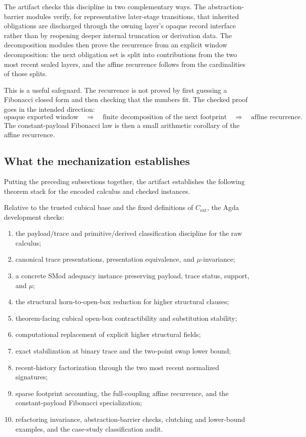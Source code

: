 The artifact checks this discipline in two complementary ways.  The abstraction-barrier modules
verify, for representative later-stage transitions, that inherited obligations are discharged
through the owning layer's opaque record interface rather than by reopening deeper internal
truncation or derivation data.  The decomposition modules then prove the recurrence from an
explicit window decomposition: the next obligation set is split into contributions from the two
most recent sealed layers, and the affine recurrence follows from the cardinalities of those
splits.

This is a useful safeguard.  The recurrence is not proved by first guessing a Fibonacci closed
form and then checking that the numbers fit.  The checked proof goes in the intended direction:
\[
  \text{opaque exported window}
  \quad\Longrightarrow\quad
  \text{finite decomposition of the next footprint}
  \quad\Longrightarrow\quad
  \text{affine recurrence}.
\]
The constant-payload Fibonacci law is then a small arithmetic corollary of the affine
recurrence.

\subsection{What the mechanization establishes}
\label{subsec:what-mechanization-establishes}

Putting the preceding subsections together, the artifact establishes the following theorem
stack for the encoded calculus and checked instances.

\begin{theorem}
\label{thm:mechanized-theorem-stack}
Relative to the trusted cubical base and the fixed definitions of \(C_{\mathrm{ext}}\), the
Agda development checks:
\begin{enumerate}
\item the payload/trace and primitive/derived classification discipline for the raw calculus;
\item canonical trace presentations, presentation equivalence, and \(\mu\)-invariance;
\item a concrete SMod adequacy instance preserving payload, trace status, support, and \(\mu\);
\item the structural horn-to-open-box reduction for higher structural clauses;
\item theorem-facing cubical open-box contractibility and substitution stability;
\item computational replacement of explicit higher structural fields;
\item exact stabilization at binary trace and the two-point swap lower bound;
\item recent-history factorization through the two most recent normalized signatures;
\item sparse footprint accounting, the full-coupling affine recurrence, and the constant-payload
Fibonacci specialization;
\item refactoring invariance, abstraction-barrier checks, clutching and lower-bound examples,
and the case-study classification audit.
\end{enumerate}
\end{theorem}


